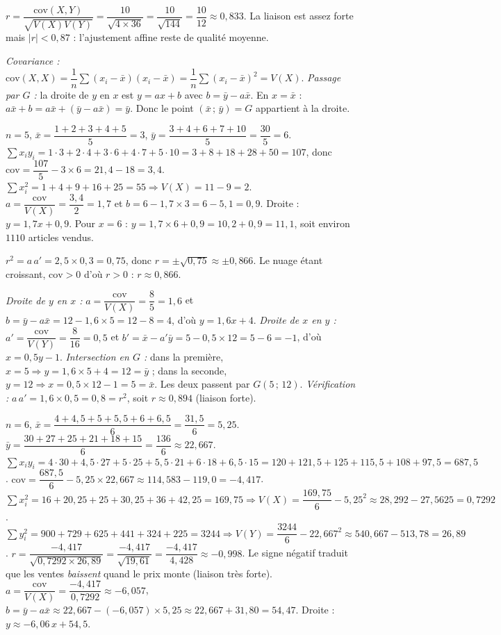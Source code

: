 $r=\dfrac{\mathrm{cov}(X,Y)}{\sqrt{V(X)V(Y)}}=\dfrac{10}{\sqrt{4\times36}}=\dfrac{10}{\sqrt{144}}=\dfrac{10}{12}\approx0{,}833$.
La liaison est assez forte mais $|r|<0{,}87$ : l'ajustement affine reste de qualité moyenne.

\emph{Covariance :} $\mathrm{cov}(X,X)=\dfrac1n\sum(x_i-\bar x)(x_i-\bar x)=\dfrac1n\sum(x_i-\bar x)^2=V(X)$.\;
\emph{Passage par $G$ :} la droite de $y$ en $x$ est $y=ax+b$ avec $b=\bar y-a\bar x$.
En $x=\bar x$ : $a\bar x+b=a\bar x+(\bar y-a\bar x)=\bar y$. Donc le point $(\bar x\,;\,\bar y)=G$
appartient à la droite.

$n=5$, $\bar x=\dfrac{1+2+3+4+5}{5}=3$, $\bar y=\dfrac{3+4+6+7+10}{5}=\dfrac{30}{5}=6$.
$\sum x_iy_i=1\!\cdot\!3+2\!\cdot\!4+3\!\cdot\!6+4\!\cdot\!7+5\!\cdot\!10=3+8+18+28+50=107$, donc
$\mathrm{cov}=\dfrac{107}{5}-3\times6=21{,}4-18=3{,}4$.
$\sum x_i^2=1+4+9+16+25=55\Rightarrow V(X)=11-9=2$.
$a=\dfrac{\mathrm{cov}}{V(X)}=\dfrac{3{,}4}{2}=1{,}7$ et $b=6-1{,}7\times3=6-5{,}1=0{,}9$.
Droite : $y=1{,}7x+0{,}9$. Pour $x=6$ : $y=1{,}7\times6+0{,}9=10{,}2+0{,}9=11{,}1$, soit environ
$1110$ articles vendus.

$r^2=a\,a'=2{,}5\times0{,}3=0{,}75$, donc $r=\pm\sqrt{0{,}75}\approx\pm0{,}866$. Le nuage étant
croissant, $\mathrm{cov}>0$ d'où $r>0$ : $r\approx0{,}866$.

\emph{Droite de $y$ en $x$ :} $a=\dfrac{\mathrm{cov}}{V(X)}=\dfrac{8}{5}=1{,}6$ et
$b=\bar y-a\bar x=12-1{,}6\times5=12-8=4$, d'où $y=1{,}6x+4$.\;
\emph{Droite de $x$ en $y$ :} $a'=\dfrac{\mathrm{cov}}{V(Y)}=\dfrac{8}{16}=0{,}5$ et
$b'=\bar x-a'\bar y=5-0{,}5\times12=5-6=-1$, d'où $x=0{,}5y-1$.\;
\emph{Intersection en $G$ :} dans la première, $x=5\Rightarrow y=1{,}6\times5+4=12=\bar y$ ; dans la
seconde, $y=12\Rightarrow x=0{,}5\times12-1=5=\bar x$. Les deux passent par $G(5\,;\,12)$.\;
\emph{Vérification :} $a\,a'=1{,}6\times0{,}5=0{,}8=r^2$, soit $r\approx0{,}894$ (liaison forte).

$n=6$, $\bar x=\dfrac{4+4{,}5+5+5{,}5+6+6{,}5}{6}=\dfrac{31{,}5}{6}=5{,}25$.
$\bar y=\dfrac{30+27+25+21+18+15}{6}=\dfrac{136}{6}\approx22{,}667$.
$\sum x_iy_i=4\!\cdot\!30+4{,}5\!\cdot\!27+5\!\cdot\!25+5{,}5\!\cdot\!21+6\!\cdot\!18+6{,}5\!\cdot\!15
=120+121{,}5+125+115{,}5+108+97{,}5=687{,}5$.
$\mathrm{cov}=\dfrac{687{,}5}{6}-5{,}25\times22{,}667\approx114{,}583-119{,}0=-4{,}417$.
$\sum x_i^2=16+20{,}25+25+30{,}25+36+42{,}25=169{,}75\Rightarrow V(X)=\dfrac{169{,}75}{6}-5{,}25^2
\approx28{,}292-27{,}5625=0{,}7292$.
$\sum y_i^2=900+729+625+441+324+225=3244\Rightarrow V(Y)=\dfrac{3244}{6}-22{,}667^2
\approx540{,}667-513{,}78=26{,}89$.
$r=\dfrac{-4{,}417}{\sqrt{0{,}7292\times26{,}89}}=\dfrac{-4{,}417}{\sqrt{19{,}61}}=\dfrac{-4{,}417}{4{,}428}\approx-0{,}998$.
Le signe négatif traduit que les ventes \emph{baissent} quand le prix monte (liaison très forte).
$a=\dfrac{\mathrm{cov}}{V(X)}=\dfrac{-4{,}417}{0{,}7292}\approx-6{,}057$,
$b=\bar y-a\bar x\approx22{,}667-(-6{,}057)\times5{,}25\approx22{,}667+31{,}80=54{,}47$.
Droite : $y\approx-6{,}06\,x+54{,}5$.

